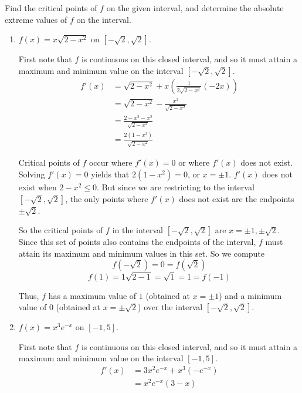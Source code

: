 \documentclass[handout,nooutcomes]{ximera}
\begin{document}
\begin{problem}
Find the critical points of $f$ on the given interval, and determine the absolute extreme values of $f$ on the interval.
		\begin{enumerate}
		
			\item  $f(x) = x \sqrt{2-x^2}$ on $[ -\sqrt{2}, \sqrt{2} ]$.
				
				\begin{freeResponse}
				First note that $f$ is continuous on this closed interval, and so it must attain a maximum and minimum value on the interval $[-\sqrt{2}, \sqrt{2}]$.
				\begin{align*}
				f'(x) &= \sqrt{2-x^2} + x \left( \frac{1}{2 \sqrt{2-x^2}} (-2x) \right) \\
				&= \sqrt{2-x^2} - \frac{x^2}{\sqrt{2-x^2}} \\
				&= \frac{2-x^2-x^2}{\sqrt{2-x^2}} \\
				&= \frac{2(1-x^2)}{\sqrt{2-x^2}}
				\end{align*}
				
				Critical points of $f$ occur where $f'(x) = 0$ or where $f'(x)$ does not exist.  Solving $f'(x) = 0$ yields that $2(1-x^2) = 0$, or $x = \pm 1$.  $f'(x)$ does not exist when $2-x^2 \leq 0$.  But since we are restricting to the interval $[-\sqrt{2}, \sqrt{2}]$, the only points where $f'(x)$ does not exist are the endpoints $\pm \sqrt{2}$.  
				
				So the critical points of $f$ in the interval $[-\sqrt{2}, \sqrt{2}]$ are $x = \pm 1, \pm \sqrt{2}$.  Since this set of points also contains the endpoints of the interval, $f$ must attain its maximum and minimum values in this set.  So we compute
				$$ f(-\sqrt{2}) = 0 = f(\sqrt{2}) $$
				$$ f(1) = 1 \sqrt{2-1} = \sqrt{1} = 1 = f(-1) $$
				
				Thus, $f$ has a maximum value of $1$ (obtained at $x=\pm 1$) and a minimum value of 0 (obtained at $x=\pm \sqrt{2}$) over the interval $[-\sqrt{2}, \sqrt{2}]$.
				\end{freeResponse}
				
				
				
			\item  $f(x) = x^3 e^{-x}$ on $[-1,5]$.
			
				\begin{freeResponse}
				First note that $f$ is continuous on this closed interval, and so it must attain a maximum and minimum value on the interval $[-1,5]$.
				\begin{align*}
				f'(x) &= 3x^2 e^{-x} + x^3(-e^{-x}) \\
				&= x^2 e^{-x} (3-x)
				\end{align*}
				

\end{freeResponse}
\end{enumerate}
\end{problem}
\end{document}
